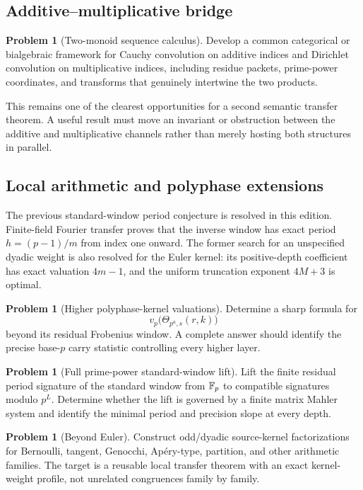 \documentclass[11pt]{article}
\theoremstyle{definition}\newtheorem{definition}[theorem]{Definition}\newtheorem{example}[theorem]{Example}\newtheorem{construction}[theorem]{Construction}\newtheorem{algorithm}[theorem]{Algorithm}\newtheorem{conjecture}[theorem]{Conjecture}\newtheorem{problem}[theorem]{Problem}
\theoremstyle{remark}\newtheorem{remark}[theorem]{Remark}\newtheorem{boundary}[theorem]{Boundary}\newtheorem{certificate}[theorem]{Computational Certificate}\newtheorem{classical}[theorem]{Classical Input}\newtheorem{principle}[theorem]{Structural Principle}
\begin{document}
\subsection{Additive--multiplicative bridge}
\begin{problem}[Two-monoid sequence calculus]
Develop a common categorical or bialgebraic framework for Cauchy convolution on additive indices and Dirichlet convolution on multiplicative indices, including residue packets, prime-power coordinates, and transforms that genuinely intertwine the two products.
\end{problem}

This remains one of the clearest opportunities for a second semantic transfer theorem.  A useful result must move an invariant or obstruction between the additive and multiplicative channels rather than merely hosting both structures in parallel.

\subsection{Local arithmetic and polyphase extensions}
The previous standard-window period conjecture is resolved in this edition.  Finite-field Fourier transfer proves that the inverse window has exact period $h=(p-1)/m$ from index one onward.  The former search for an unspecified dyadic weight is also resolved for the Euler kernel: its positive-depth coefficient has exact valuation $4m-1$, and the uniform truncation exponent $4M+3$ is optimal.

\begin{problem}[Higher polyphase-kernel valuations]
Determine a sharp formula for
\[
 v_p\bigl(\Theta_{p^a,s}(r,k)\bigr)
\]
beyond its residual Frobenius window.  A complete answer should identify the precise base-$p$ carry statistic controlling every higher layer.
\end{problem}

\begin{problem}[Full prime-power standard-window lift]
Lift the finite residual period signature of the standard window from $\mathbb F_p$ to compatible signatures modulo $p^L$.  Determine whether the lift is governed by a finite matrix Mahler system and identify the minimal period and precision slope at every depth.
\end{problem}

\begin{problem}[Beyond Euler]
Construct odd/dyadic source-kernel factorizations for Bernoulli, tangent, Genocchi, Ap\'ery-type, partition, and other arithmetic families.  The target is a reusable local transfer theorem with an exact kernel-weight profile, not unrelated congruences family by family.
\end{problem}
\end{document}
